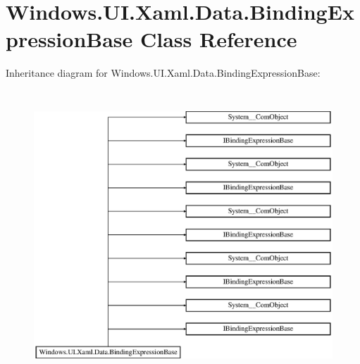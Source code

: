 \hypertarget{class_windows_1_1_u_i_1_1_xaml_1_1_data_1_1_binding_expression_base}{}\section{Windows.\+U\+I.\+Xaml.\+Data.\+Binding\+Expression\+Base Class Reference}
\label{class_windows_1_1_u_i_1_1_xaml_1_1_data_1_1_binding_expression_base}
Inheritance diagram for Windows.\+U\+I.\+Xaml.\+Data.\+Binding\+Expression\+Base\+:\begin{figure}[H]
\begin{center}
\leavevmode
\includegraphics[height=10.883392cm]{class_windows_1_1_u_i_1_1_xaml_1_1_data_1_1_binding_expression_base}
\end{center}
\end{figure}
